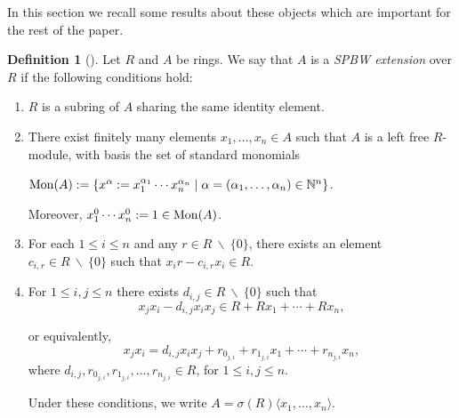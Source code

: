 \documentclass{amsart}
\theoremstyle{definition}
\newtheorem{definition}[theorem]{Definition}
\theoremstyle{remark}
\numberwithin{equation}{section}
\begin{document}
In this section we recall some  results about these objects which are important for the rest of the paper.
\begin{definition}[{\cite[Definition 1]{GallegoLezama2010}}]\label{def.skewpbwextensions}
Let $R$ and $A$ be rings. We say that $A$ is a \textit{SPBW extension} over $R$ if the following conditions hold:
\begin{enumerate}
\item[\rm (i)] $R$ is a subring of $A$ sharing the same identity element.

\item[\rm (ii)] There exist finitely many elements $x_1,\dots ,x_n\in A$ such that $A$ is a left free $R$-module, with basis the
set of standard monomials
\begin{center}
${\rm Mon}(A):= \{x^{\alpha}:=x_1^{\alpha_1}\cdots x_n^{\alpha_n}\mid \alpha=(\alpha_1,\dots
,\alpha_n)\in \mathbb{N}^n\}$.
\end{center}
Moreover, $x^0_1\cdots x^0_n := 1 \in {\rm Mon}(A)$.

\item[\rm (iii)] For each $1\leq i\leq n$ and any $r\in R\ \backslash\ \{0\}$, there exists an element $c_{i,r}\in R\ \backslash\ \{0\}$ such that
$x_ir-c_{i,r}x_i\in R.$

\item[\rm (iv)] For $1\leq i,j\leq n$ there exists $d_{i,j}\in R\ \backslash\ \{0\}$ such that
\begin{equation}\label{sigmadefinicion2}
x_jx_i - d_{i,j}x_ix_j\in R+Rx_1+\cdots +Rx_n,
\end{equation}

or equivalently, 
\begin{equation}\label{eq.rep variables x}
x_jx_i = d_{i,j}x_ix_j+r_{0_{j,i}} + r_{1_{j,i}}x_{1} + \cdots +
r_{n_{j,i}}x_{n},
\end{equation}
where $d_{i,j},r_{0_{j,i}},  r_{1_{j,i}}, \dots, r_{n_{j,i}}\in R$, for $1\leq i,j\leq n$.

Under these conditions, we write $A=\sigma(R)\langle x_1,\dots,x_n\rangle$.
\end{enumerate}
\end{definition}
\end{document}
